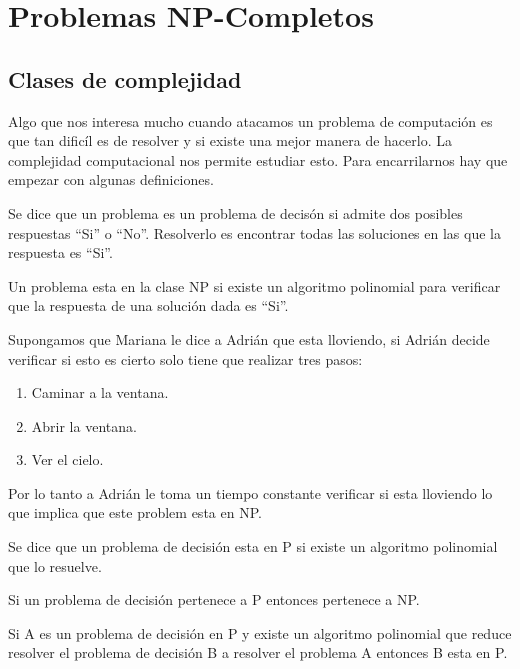\chapter{Problemas NP-Completos}

\section{Clases de complejidad}
Algo que nos interesa mucho cuando atacamos un problema de computación es que tan dificíl es de resolver y si existe una mejor manera de hacerlo. La complejidad computacional nos permite estudiar esto. Para encarrilarnos hay que empezar con algunas definiciones.
\begin{dfn}
Se dice que un problema es un problema de decisón si admite dos posibles respuestas ``Si'' o ``No''. Resolverlo es encontrar todas las soluciones en las que la respuesta es ``Si''.
\end{dfn}
\begin{dfn}
Un problema esta en la clase NP si existe un algoritmo polinomial para verificar que la respuesta de una solución dada es ``Si''.
\end{dfn}
\begin{eje}
Supongamos que Mariana le dice a Adrián que esta lloviendo, si Adrián decide verificar si esto es cierto solo tiene que realizar tres pasos:
\begin{enumerate}
\item Caminar a la ventana.
\item Abrir la ventana.
\item Ver el cielo.
\end{enumerate}
Por lo tanto a Adrián le toma un tiempo constante verificar si esta lloviendo lo que implica que este problem esta en NP.
\end{eje}
\begin{dfn}
Se dice que un problema de decisión esta en P si existe un algoritmo polinomial que lo resuelve.
\end{dfn}
\begin{obs}[$P  \subseteq NP$]
Si un problema de decisión pertenece a P entonces pertenece a NP.
\end{obs}
\begin{obs}
Si A es un problema de decisión en P y existe un algoritmo polinomial que reduce resolver el problema de decisión B a resolver el problema A entonces B esta en P.
\end{obs}

